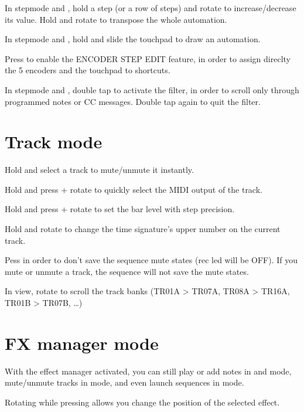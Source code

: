 In stepmode  and , hold a step \stepbystepicon{} (or a row of steps) and rotate \encodericon{} to increase/decrease its value. Hold  and rotate \encodericon{} to transpose the whole automation.

In stepmode  and , hold  and slide the touchpad to draw an automation.

Press  to enable the ENCODER STEP EDIT feature, in order to assign direclty the 5 encoders and the touchpad to shortcuts.

In stepmode  and , double tap  to activate the filter, in order to scroll only through programmed notes or CC messages. Double tap  again to quit the filter.


\section{Track mode}

Hold  and select a track \stepbystepicon{} to mute/unmute it instantly.

Hold  and press + rotate \encodericon{} to quickly select the MIDI output of the track.

Hold  and press + rotate \encodericon{} to set the bar level with step precision.

Hold  and rotate \encodericon{} to change the time signature's upper number on the current track.

Pess  in order to don't save the sequence mute states (rec led will be OFF). If you mute or unmute a track, the sequence will not save the mute states.

In  view, rotate \encodericon{} to scroll the track banks (TR01A > TR07A, TR08A > TR16A, TR01B > TR07B, \ldots)


\section{FX manager mode}

With the effect manager activated, you can still play or add notes in  and  mode, mute/unmute tracks in  mode, and even launch sequences in  mode.

Rotating \encodericon{} while pressing  allows you change the position of the selected effect.


